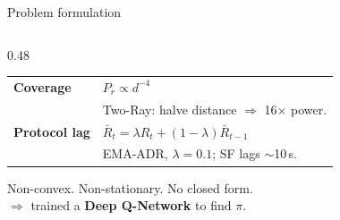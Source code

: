 \documentclass[aspectratio=169,11pt]{beamer}
\newcommand{\emp}[1]{{\color{manpurple}\textbf{#1}}}
\newcommand{\qt}[1]{{\color{muted}#1}}
\begin{document}
\begin{frame}{Problem formulation}
\begin{columns}[T]
\begin{column}{0.48\textwidth}
\begin{tabular}{@{}p{2.2cm} p{3.8cm}@{}}
        \emp{Coverage} &
          $P_r\propto d^{-4}$\\
          & \tiny\qt{Two-Ray: halve distance $\Rightarrow$ 16$\times$ power.}\\[0.4em]
        \emp{Protocol lag} &
          $\bar{R}_t=\lambda R_t+(1{-}\lambda)\bar{R}_{t-1}$\\
          & \tiny\qt{EMA-ADR, $\lambda{=}0.1$; SF lags ${\sim}$10\,s.}\\
      \end{tabular}
      \vfill
      \begin{block}{}
        \centering\small
        Non-convex. Non-stationary. No closed form.\\
        \qt{$\Rightarrow$ trained a \emp{Deep Q-Network} to find $\pi$.}
      \end{block}
    \end{column}
  \end{columns}
\end{frame}
\end{document}
